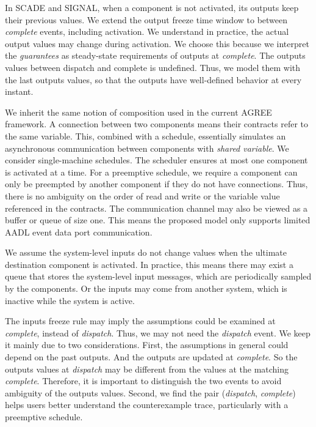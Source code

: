 In SCADE and SIGNAL, when a component is not activated, its outputs keep their previous values. We extend the output freeze time window to between \emph{complete} events, including activation. We understand in practice, the actual output values may change during activation. We choose this because we interpret the \emph{guarantees} as steady-state requirements of outputs at \emph{complete}. The outputs values between dispatch and complete is undefined. Thus, we model them with the last outputs values, so that the outputs have well-defined behavior at every instant.

We inherit the same notion of composition used in the current AGREE framework. A connection between two components means their contracts refer to the same variable. 
This, combined with a schedule, essentially simulates an asynchronous communication between components with \emph{shared variable}. 
We consider single-machine schedules. The scheduler ensures at most one component is activated at a time. For a preemptive schedule, we require a component can only be preempted by another component if they do not have connections. Thus, there is no ambiguity on the order of read and write or the variable value referenced in the contracts.
The communication channel may also be viewed as a buffer or queue of size one. %
This means the proposed model only supports limited AADL event data port communication.
 
We assume the system-level inputs do not change values when the ultimate destination component is activated. In practice, this means there may exist a queue that stores the system-level input messages, which are periodically sampled by the components. Or the inputs may come from another system, which is inactive while the system is active.

The inputs freeze rule may imply the assumptions could be examined at \emph{complete}, instead of \emph{dispatch}. Thus, we may not need the \emph{dispatch} event. We keep it mainly due to two considerations. First, the assumptions in general could depend on the past outputs. And the outputs are updated at \emph{complete}. So the outputs values at \emph{dispatch} may be different from the values at the matching \emph{complete}. Therefore, it is important to distinguish the two events to avoid ambiguity of the outputs values. Second, we find the pair (\emph{dispatch}, \emph{complete}) helps users better understand the counterexample trace, particularly with a preemptive schedule.

